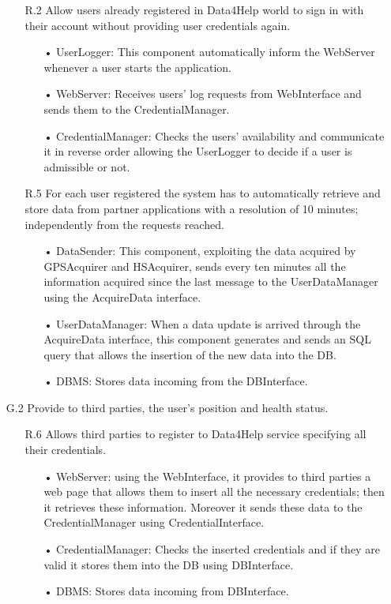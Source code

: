 \begin{enumerate}
\begin{enumerate}
	\item [R.2] Allow users already registered in Data4Help world to sign in with their account without providing user credentials again.
		\begin{enumerate}
		\item[•] UserLogger: This component automatically inform the WebServer whenever a user starts the application.
		\item[•] WebServer: Receives users' log requests from WebInterface and sends them to the CredentialManager.
		\item[•] CredentialManager: Checks the users' availability and communicate it in reverse order allowing the UserLogger to decide if a user is admissible or not.
		\end{enumerate}
	
	\item [R.5] For each user registered the system has to automatically retrieve and store data from partner applications with a resolution of 10 minutes; independently from the requests reached.
		\begin{enumerate}
		\item[•] DataSender: This component, exploiting the data acquired by GPSAcquirer and HSAcquirer, sends every ten minutes all the information acquired since the last message to the UserDataManager using the AcquireData interface.
		\item[•] UserDataManager: When a data update is arrived through the AcquireData interface, this component generates and sends an SQL query that allows the insertion of the new data into the DB.
		\item[•] DBMS: Stores data incoming from the DBInterface.
		\end{enumerate}	
	\end{enumerate}

\item [G.2] Provide to third parties, the user’s position and health status.
	\begin{enumerate}
	\item [R.6] Allows third parties to register to Data4Help service specifying all their credentials.
		\begin{enumerate}
		\item[•] WebServer: using the WebInterface, it provides to third parties a web page that allows them to insert all the necessary credentials; then it retrieves these information. Moreover it sends these data to the CredentialManager using CredentialInterface.
		\item[•] CredentialManager: Checks the inserted credentials  and if they are valid it stores them into the DB using DBInterface.
		\item[•] DBMS: Stores data incoming from DBInterface.
		\end{enumerate}
		

\end{enumerate}
\end{enumerate}
